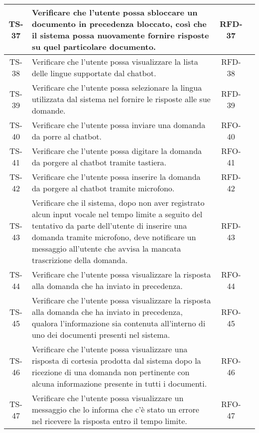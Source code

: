 \begin{xltabular}{\textwidth}{| c | X | c | c |}
    \hline
    TS-37 & Verificare che l'utente possa sbloccare un documento in precedenza bloccato, così che il sistema possa nuovamente fornire risposte su quel particolare documento. & RFD-37 & \textcolor{cmarkcolor}{} \\
    \hline
    TS-38 & Verificare che l’utente possa visualizzare la lista delle lingue supportate dal chatbot. & RFD-38 & \textcolor{xmarkcolor}{} \\
    \hline
    TS-39 &  Verificare che l'utente possa selezionare la lingua utilizzata dal sistema nel fornire le risposte alle sue domande. & RFD-39 & \textcolor{xmarkcolor}{} \\
    \hline
    TS-40 & Verificare che l'utente possa inviare una domanda da porre al chatbot. & RFO-40 & \textcolor{cmarkcolor}{} \\
    \hline
    TS-41 & Verificare che l'utente possa digitare la domanda da porgere al chatbot tramite tastiera. & RFO-41 & \textcolor{cmarkcolor}{} \\
    \hline
    TS-42 & Verificare che l’utente possa inserire la domanda da porgere al chatbot tramite microfono. & RFD-42 & \textcolor{xmarkcolor}{} \\
    \hline
    TS-43 & Verificare che il sistema, dopo non aver registrato alcun input vocale nel tempo limite a seguito del tentativo da parte dell'utente di inserire una domanda tramite microfono, deve notificare un messaggio all'utente che avvisa la mancata trascrizione della domanda. & RFD-43 & \textcolor{xmarkcolor}{} \\
    \hline
    TS-44 & Verificare che l’utente possa visualizzare la risposta alla domanda che ha inviato in precedenza. &  RFO-44 & \textcolor{cmarkcolor}{} \\
    \hline
    TS-45 & Verificare che l’utente possa visualizzare la risposta alla domanda che ha inviato in precedenza, qualora l'informazione sia contenuta all'interno di uno dei documenti presenti nel sistema. &  RFO-45 & \textcolor{cmarkcolor}{} \\
    \hline
    TS-46 & Verificare che l’utente possa visualizzare una risposta di cortesia prodotta dal sistema dopo la ricezione di una domanda non pertinente con alcuna informazione presente in tutti i documenti. & RFO-46 & \textcolor{cmarkcolor}{} \\
    \hline
    TS-47 & Verificare che l'utente possa visualizzare un messaggio che lo informa che c'è stato un errore nel ricevere la risposta entro il tempo limite. & RFO-47 & \textcolor{cmarkcolor}{} \\

\end{xltabular}
